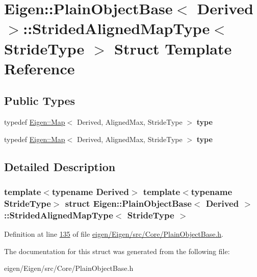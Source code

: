 \hypertarget{struct_eigen_1_1_plain_object_base_1_1_strided_aligned_map_type}{}\section{Eigen\+:\+:Plain\+Object\+Base$<$ Derived $>$\+:\+:Strided\+Aligned\+Map\+Type$<$ Stride\+Type $>$ Struct Template Reference}
\label{struct_eigen_1_1_plain_object_base_1_1_strided_aligned_map_type}
\subsection*{Public Types}
\begin{DoxyCompactItemize}
\item 
\mbox{\label{struct_eigen_1_1_plain_object_base_1_1_strided_aligned_map_type_ac9f25f094c2fb27ba267a25b38e4ee69}} 
typedef \hyperlink{group___core___module_class_eigen_1_1_map}{Eigen\+::\+Map}$<$ Derived, Aligned\+Max, Stride\+Type $>$ {\bfseries type}
\item 
\mbox{\label{struct_eigen_1_1_plain_object_base_1_1_strided_aligned_map_type_ac9f25f094c2fb27ba267a25b38e4ee69}} 
typedef \hyperlink{group___core___module_class_eigen_1_1_map}{Eigen\+::\+Map}$<$ Derived, Aligned\+Max, Stride\+Type $>$ {\bfseries type}
\end{DoxyCompactItemize}


\subsection{Detailed Description}
\subsubsection*{template$<$typename Derived$>$\newline
template$<$typename Stride\+Type$>$\newline
struct Eigen\+::\+Plain\+Object\+Base$<$ Derived $>$\+::\+Strided\+Aligned\+Map\+Type$<$ Stride\+Type $>$}



Definition at line \hyperlink{eigen_2_eigen_2src_2_core_2_plain_object_base_8h_source_l00135}{135} of file \hyperlink{eigen_2_eigen_2src_2_core_2_plain_object_base_8h_source}{eigen/\+Eigen/src/\+Core/\+Plain\+Object\+Base.\+h}.



The documentation for this struct was generated from the following file\+:\begin{DoxyCompactItemize}
\item 
eigen/\+Eigen/src/\+Core/\+Plain\+Object\+Base.\+h\end{DoxyCompactItemize}
